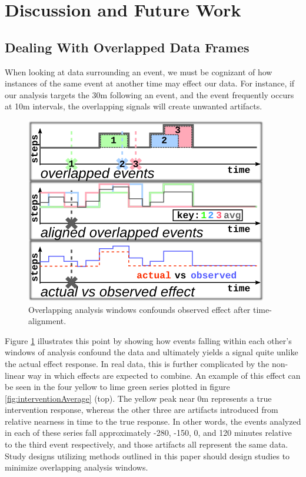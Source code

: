 \section{Discussion and Future Work}

\subsection{Dealing With Overlapped Data Frames}
When looking at data surrounding an event, we must be cognizant of how instances of the same event at another time may effect our data.
For instance, if our analysis targets the 30m following an event, and the event frequently occurs at 10m intervals, the overlapping signals will create unwanted artifacts.

\begin{figure}
\centering
\includegraphics[width=0.6\columnwidth]{./img/eventOverlapExample.png}
\caption{Overlapping analysis windows confounds observed effect after time-alignment.}
\label{fig:overlapExample}
\end{figure}

Figure \ref{fig:overlapExample} illustrates this point by showing how events falling within each other's windows of analysis confound the data and ultimately yields a signal quite unlike the actual effect response.
In real data, this is further complicated by the non-linear way in which effects are expected to combine.
An example of this effect can be seen in the four yellow to lime green series plotted in figure \ref{fig:interventionAverage} (top).
The yellow peak near 0m represents a true intervention response, whereas the other three are artifacts introduced from relative nearness in time to the true response.
In other words, the events analyzed in each of these series fall approximately -280, -150, 0, and 120 minutes relative to the third event respectively, and those artifacts all represent the same data.
Study designs utilizing methods outlined in this paper should design studies to minimize overlapping analysis windows.

